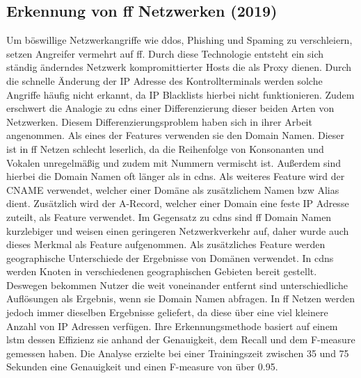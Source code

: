 \documentclass[
    12pt, %
    DIV10,
    ngerman, %
    a4paper, %
    oneside, %
    titlepage, %
    parskip=half, %
    headings=normal, %
    listof=totoc, %
    bibliography=totoc, %
    index=totoc, %
    captions=tableheading, %
    final %
]{scrreprt}
\begin{document}
\subsection{Erkennung von \acs{ff} Netzwerken (2019)}
Um böswillige Netzwerkangriffe wie \ac{ddos}, Phishing und Spaming zu verschleiern, setzen Angreifer vermehrt auf \ac{ff}. Durch diese Technologie entsteht ein sich ständig änderndes Netzwerk kompromittierter Hosts die als Proxy dienen. Durch die schnelle Änderung der IP Adresse des Kontrollterminals werden solche Angriffe häufig nicht erkannt, da IP Blacklists hierbei nicht funktionieren. Zudem erschwert die Analogie zu \ac{cdns} einer Differenzierung dieser beiden Arten von Netzwerken.
Diesem Differenzierungsproblem haben sich \textcite{Chen2019} in ihrer Arbeit angenommen. Als eines der Features verwenden sie den Domain Namen. Dieser ist in \ac{ff} Netzen schlecht leserlich, da die Reihenfolge von Konsonanten und Vokalen unregelmä{\ss}ig und zudem mit Nummern vermischt ist. Au{\ss}erdem sind hierbei die Domain Namen oft länger als in \ac{cdns}. Als weiteres Feature wird der CNAME verwendet, welcher einer Domäne als zusätzlichem Namen bzw Alias dient. Zusätzlich wird der A-Record, welcher einer Domain eine feste IP Adresse zuteilt, als Feature verwendet. Im Gegensatz zu \ac{cdns} sind \ac{ff} Domain Namen kurzlebiger und weisen einen geringeren Netzwerkverkehr auf, daher wurde auch dieses Merkmal als Feature aufgenommen. Als zusätzliches Feature werden geographische Unterschiede der Ergebnisse von Domänen verwendet. In \ac{cdns} werden Knoten in verschiedenen geographischen Gebieten bereit gestellt. Deswegen bekommen Nutzer die weit voneinander entfernt sind unterschiedliche Auflösungen als Ergebnis, wenn sie Domain Namen abfragen. In \ac{ff} Netzen werden jedoch immer dieselben Ergebnisse geliefert, da diese über eine viel kleinere Anzahl von IP Adressen verfügen. Ihre Erkennungsmethode basiert auf einem \ac{lstm} dessen Effizienz sie anhand der Genauigkeit, dem Recall und dem F-measure gemessen haben. Die Analyse erzielte bei einer Trainingszeit zwischen 35 und 75 Sekunden eine Genauigkeit und einen F-measure von über 0.95.
%
\end{document}
